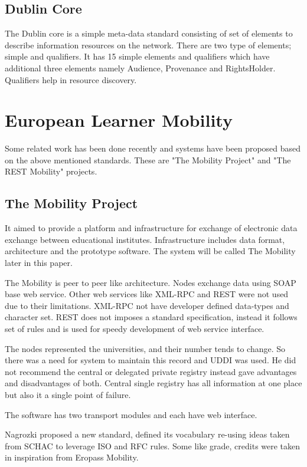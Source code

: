 \documentclass[12pt,a4paper,oneside]{book} %
\begin{document}
    \subsection{Dublin Core}
    The Dublin core is a simple meta-data standard consisting of set of elements to describe information resources on the network. There are two type of elements; simple and qualifiers. It has 15 simple elements and qualifiers which have additional three elements namely Audience, Provenance and RightsHolder. Qualifiers help in resource discovery.

\section{European Learner Mobility}
Some related work has been done recently and systems have been proposed based on the above mentioned standards. These are "The Mobility Project" and "The REST Mobility" projects.

    \subsection{The Mobility Project}
    It aimed to provide a platform and infrastructure for exchange of electronic data exchange between educational institutes. Infrastructure includes data format, architecture and the prototype software. The system will be called The Mobility later in this paper.

    The Mobility is peer to peer like architecture. Nodes exchange data using SOAP base web service. Other web services like XML-RPC and REST were not used due to their limitations. XML-RPC not have developer defined data-types and character set. REST does not imposes a standard specification, instead it follows set of rules and is used for speedy development of web service interface.

    The nodes represented the universities, and their number tends to change. So there was a need for system to maintain this record and UDDI was used. He did not recommend the central or delegated private registry instead gave advantages and disadvantages of both. Central single registry has all information at one place but also it a single point of failure.

    The software has two transport modules and each have web interface.

    Nagrozki proposed a new standard, defined its vocabulary re-using ideas taken from SCHAC to leverage ISO and RFC rules. Some like grade, credits were taken in inspiration from Eropass Mobility.
\end{document}
